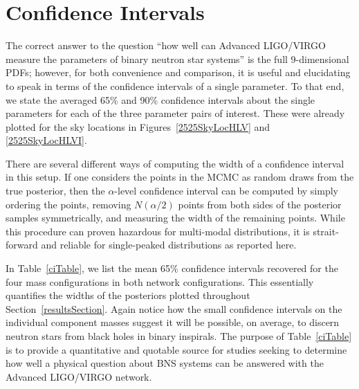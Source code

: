 \documentclass[11pt,a4paper]{emulateapj}
\newcommand{\carl}[1]{{\color{red}  #1}}
\begin{document}

\section{Confidence Intervals}
\label{ciSection}

The correct answer to the question ``how well can Advanced LIGO/VIRGO measure the parameters of binary neutron star systems'' is the full 9-dimensional PDFs; however, for both convenience and comparison, it is useful and elucidating to speak in terms of the confidence intervals of a single parameter.  To that end, we state the averaged 65\% and 90\% confidence intervals about the single parameters for each of the three parameter pairs of interest.  These were already plotted for the sky locations in Figures~\ref{2525SkyLocHLV} and \ref{2525SkyLocHLVI}.  

There are several different ways of computing the width of a confidence interval in this setup.  If one considers the points in the MCMC as random draws from the true posterior, then the $\alpha$-level confidence interval can be computed by simply ordering the points, removing $N(\alpha / 2)$ points from both sides of the posterior samples symmetrically, and measuring the width of the remaining points.  While this procedure can proven hazardous for multi-modal distributions, it is strait-forward and reliable for single-peaked distributions as reported here.

In Table~\ref{ciTable}, we list the mean 65\% confidence intervals recovered for the four mass configurations in both network configurations. 
This essentially quantifies the widths of the posteriors plotted throughout Section~\ref{resultsSection}.  Again notice how the small confidence
intervals on the individual component masses suggest it will be possible, on average, to discern neutron stars from black holes in binary inspirals.  
The purpose of Table~\ref{ciTable} is to provide a quantitative and quotable source for studies seeking to determine how well a physical question
about BNS systems can be answered with the Advanced LIGO/VIRGO network.
 
\end{document}
